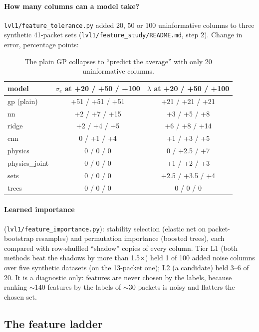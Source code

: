 \documentclass[10pt]{article}
\newcommand{\code}[1]{\texttt{#1}}
\begin{document}
\paragraph{How many columns can a model take?} \code{lvl1/feature\_tolerance.py} added 20, 50 or 100 uninformative columns to three
synthetic 41-packet sets (\code{lvl1/feature\_study/README.md}, step 2). Change in error, percentage points:

\begin{table}[H]
\centering\small
\begin{tabular}{lcc}
\toprule
model & $\sigma_e$ at +20 / +50 / +100 & $\lambda$ at +20 / +50 / +100 \\
\midrule
gp (plain) & +51 / +51 / +51 & +21 / +21 / +21 \\
nn & +2 / +7 / +15 & +3 / +5 / +8 \\
ridge & +2 / +4 / +5 & +6 / +8 / +14 \\
cnn & 0 / +1 / +4 & +1 / +3 / +5 \\
physics & 0 / 0 / 0 & 0 / +2.5 / +7 \\
physics\_joint & 0 / 0 / 0 & +1 / +2 / +3 \\
sets & 0 / 0 / 0 & +2.5 / +3.5 / +4 \\
trees & 0 / 0 / 0 & 0 / 0 / 0 \\
\bottomrule
\end{tabular}
\caption{The plain GP collapses to ``predict the average'' with only 20 uninformative columns.}
\end{table}

\paragraph{Learned importance} (\code{lvl1/feature\_importance.py}): stability selection (elastic net on packet-bootstrap resamples) and
permutation importance (boosted trees), each compared with row-shuffled ``shadow'' copies of every column. Tier L1 (both methods beat
the shadows by more than 1.5$\times$) held 1 of 100 added noise columns over five synthetic datasets (on the 13-packet one); L2 (a candidate) held 3--6 of 20.
It is a diagnostic only: features are never chosen by the labels, because ranking $\sim$140 features by the labels of $\sim$30 packets
is noisy and flatters the chosen set.

\subsection{The feature ladder}
\label{sec:lvl1ladder}
\end{document}
